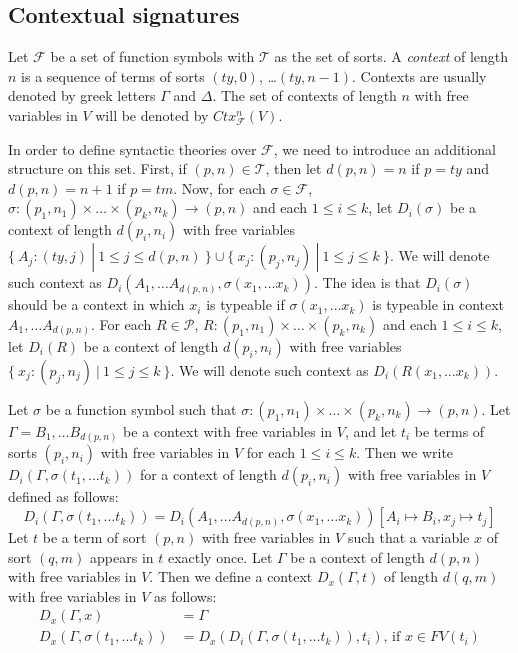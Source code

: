 \documentclass{amsart}
\theoremstyle{definition}
\theoremstyle{remark}
\numberwithin{figure}{section}
\begin{document}
\subsection{Contextual signatures}

Let $\mathcal{F}$ be a set of function symbols with $\mathcal{T}$ as the set of sorts.
A \emph{context} of length $n$ is a sequence of terms of sorts $(ty,0)$, \ldots $(ty,n-1)$.
Contexts are usually denoted by greek letters $\Gamma$ and $\Delta$.
The set of contexts of length $n$ with free variables in $V$ will be denoted by $Ctx^n_\mathcal{F}(V)$.

In order to define syntactic theories over $\mathcal{F}$, we need to introduce an additional structure on this set.
First, if $(p,n) \in \mathcal{T}$, then let $d(p,n) = n$ if $p = ty$ and $d(p,n) = n+1$ if $p = tm$.
Now, for each $\sigma \in \mathcal{F}$, $\sigma : (p_1,n_1) \times \ldots \times (p_k,n_k) \to (p,n)$ and each $1 \leq i \leq k$,
let $D_i(\sigma)$ be a context of length $d(p_i,n_i)$ with free variables $\{\ A_j : (ty,j)\ |\ 1 \leq j \leq d(p,n)\ \} \cup \{\ x_j : (p_j,n_j)\ |\ 1 \leq j \leq k\ \}$.
We will denote such context as $D_i(A_1, \ldots A_{d(p,n)}, \sigma(x_1, \ldots x_k))$.
The idea is that $D_i(\sigma)$ should be a context in which $x_i$ is typeable if $\sigma(x_1, \ldots x_k)$ is typeable in context $A_1, \ldots A_{d(p,n)}$.
For each $R \in \mathcal{P}$, $R : (p_1,n_1) \times \ldots \times (p_k,n_k)$ and each $1 \leq i \leq k$,
let $D_i(R)$ be a context of length $d(p_i,n_i)$ with free variables $\{\ x_j : (p_j,n_j)\ |\ 1 \leq j \leq k\ \}$.
We will denote such context as $D_i(R(x_1, \ldots x_k))$.

Let $\sigma$ be a function symbol such that $\sigma : (p_1,n_1) \times \ldots \times (p_k,n_k) \to (p,n)$.
Let $\Gamma = B_1, \ldots B_{d(p,n)}$ be a context with free variables in $V$, and let $t_i$ be terms of sorts $(p_i,n_i)$ with free variables in $V$ for each $1 \leq i \leq k$.
Then we write $D_i(\Gamma, \sigma(t_1, \ldots t_k))$ for a context of length $d(p_i,n_i)$ with free variables in $V$ defined as follows:
\[ D_i(\Gamma, \sigma(t_1, \ldots t_k)) = D_i(A_1, \ldots A_{d(p,n)}, \sigma(x_1, \ldots x_k))[A_i \mapsto B_i, x_j \mapsto t_j] \]
Let $t$ be a term of sort $(p,n)$ with free variables in $V$ such that a variable $x$ of sort $(q,m)$ appears in $t$ exactly once.
Let $\Gamma$ be a context of length $d(p,n)$ with free variables in $V$.
Then we define a context $D_x(\Gamma, t)$ of length $d(q,m)$ with free variables in $V$ as follows:
\begin{align*}
D_x(\Gamma, x) & = \Gamma \\
D_x(\Gamma, \sigma(t_1, \ldots t_k)) & = D_x(D_i(\Gamma, \sigma(t_1, \ldots t_k)), t_i) \text{, if $x \in FV(t_i)$}
\end{align*}
\end{document}
